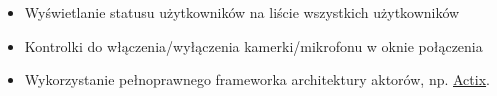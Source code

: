 \begin{itemize}
    \item Wyświetlanie statusu użytkowników na liście wszystkich użytkowników
    \item Kontrolki do włączenia/wyłączenia kamerki/mikrofonu w oknie połączenia
    \item Wykorzystanie pełnoprawnego frameworka architektury aktorów, np. \href{https://github.com/actix/actix}{Actix}.
\end{itemize}



